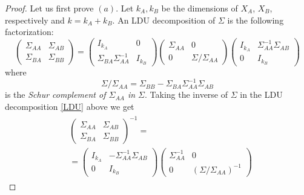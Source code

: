 \documentclass{book}
\theoremstyle{plain}%
\theoremstyle{definition}
\begin{document}
    \begin{proof}
        Let us first prove $(a)$.
        Let $k_A, k_B$ be the dimensions of $X_A$, $X_B$, respectively
        and $k=k_A+k_B$.
        An LDU decomposition of $\Sigma$ is the following factorization:
        \begin{equation}
        \label{LDU}
        \begin{pmatrix}
            \Sigma_{AA} & \Sigma_{AB}\\
            \Sigma_{BA} & \Sigma_{BB}
        \end{pmatrix}
        =
        \begin{pmatrix}
            I_{k_A} & 0\\
            \Sigma_{BA}\Sigma_{AA}^{-1} & I_{k_B}
        \end{pmatrix}
        \begin{pmatrix}
            \Sigma_{AA} & 0\\
            0 & \Sigma/\Sigma_{AA}
        \end{pmatrix}
        \begin{pmatrix}
            I_{k_A} & \Sigma_{AA}^{-1}\Sigma_{AB}\\
            0 & I_{k_B}
        \end{pmatrix}
        \end{equation}
        where 
            $$
            \Sigma/\Sigma_{AA}
            =
            \Sigma_{BB}-\Sigma_{BA}\Sigma_{AA}^{-1}\Sigma_{AB}$$
        is the \textit{Schur complement of $\Sigma_{AA}$ in $\Sigma$}.
        Taking the inverse of $\Sigma$ in the LDU decomposition \eqref{LDU} above we get
        \begin{align}
        \label{LDU-inverse}
        \begin{split}
        &\begin{pmatrix}
            \Sigma_{AA} & \Sigma_{AB}\\
            \Sigma_{BA} & \Sigma_{BB}
        \end{pmatrix}^{-1}
        =\\
        &=\begin{pmatrix}
            I_{k_A} & -\Sigma_{AA}^{-1}\Sigma_{AB}\\
            0 & I_{k_B}
        \end{pmatrix}
        \begin{pmatrix}
            \Sigma^{-1}_{AA} & 0\\
            0 & (\Sigma/\Sigma_{AA})^{-1}
        \end{pmatrix}

\end{split}
\end{align}
\end{proof}
\end{document}
